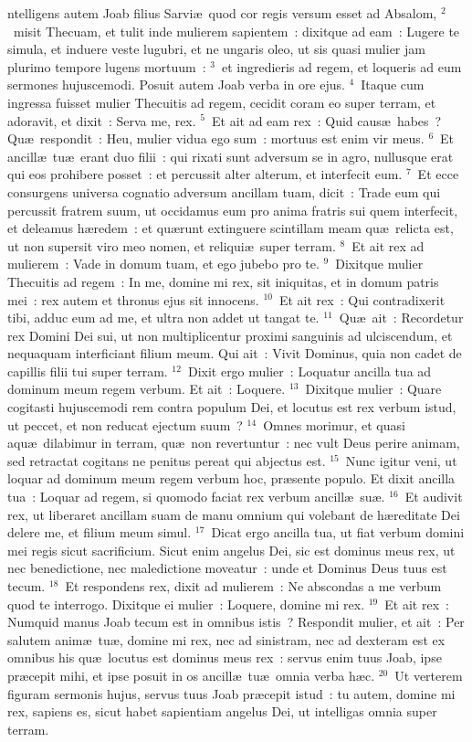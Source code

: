 \bchapter
{}ntelligens autem Joab filius Sarvi\ae\ quod cor regis versum esset ad Absalom,
${}^{2}$~misit Thecuam, et tulit inde mulierem sapientem~: dixitque ad eam~: Lugere te simula, et induere veste lugubri, et ne ungaris oleo, ut sis quasi mulier jam plurimo tempore lugens mortuum~:
${}^{3}$~et ingredieris ad regem, et loqueris ad eum sermones hujuscemodi. Posuit autem Joab verba in ore ejus.
${}^{4}$~Itaque cum ingressa fuisset mulier Thecuitis ad regem, cecidit coram eo super terram, et adoravit, et dixit~: Serva me, rex.
${}^{5}$~Et ait ad eam rex~: Quid caus\ae\ habes~? Qu\ae\ respondit~: Heu, mulier vidua ego sum~: mortuus est enim vir meus.
${}^{6}$~Et ancill\ae\ tu\ae\ erant duo filii~: qui rixati sunt adversum se in agro, nullusque erat qui eos prohibere posset~: et percussit alter alterum, et interfecit eum.
${}^{7}$~Et ecce consurgens universa cognatio adversum ancillam tuam, dicit~: Trade eum qui percussit fratrem suum, ut occidamus eum pro anima fratris sui quem interfecit, et deleamus h\ae redem~: et qu\ae runt extinguere scintillam meam qu\ae\ relicta est, ut non supersit viro meo nomen, et reliqui\ae\ super terram.
${}^{8}$~Et ait rex ad mulierem~: Vade in domum tuam, et ego jubebo pro te.
${}^{9}$~Dixitque mulier Thecuitis ad regem~: In me, domine mi rex, sit iniquitas, et in domum patris mei~: rex autem et thronus ejus sit innocens.
${}^{10}$~Et ait rex~: Qui contradixerit tibi, adduc eum ad me, et ultra non addet ut tangat te.
${}^{11}$~Qu\ae\ ait~: Recordetur rex Domini Dei sui, ut non multiplicentur proximi sanguinis ad ulciscendum, et nequaquam interficiant filium meum. Qui ait~: Vivit Dominus, quia non cadet de capillis filii tui super terram.
${}^{12}$~Dixit ergo mulier~: Loquatur ancilla tua ad dominum meum regem verbum. Et ait~: Loquere.
${}^{13}$~Dixitque mulier~: Quare cogitasti hujuscemodi rem contra populum Dei, et locutus est rex verbum istud, ut peccet, et non reducat ejectum suum~?
${}^{14}$~Omnes morimur, et quasi aqu\ae\ dilabimur in terram, qu\ae\ non revertuntur~: nec vult Deus perire animam, sed retractat cogitans ne penitus pereat qui abjectus est.
${}^{15}$~Nunc igitur veni, ut loquar ad dominum meum regem verbum hoc, pr\ae sente populo. Et dixit ancilla tua~: Loquar ad regem, si quomodo faciat rex verbum ancill\ae\ su\ae .
${}^{16}$~Et audivit rex, ut liberaret ancillam suam de manu omnium qui volebant de h\ae reditate Dei delere me, et filium meum simul.
${}^{17}$~Dicat ergo ancilla tua, ut fiat verbum domini mei regis sicut sacrificium. Sicut enim angelus Dei, sic est dominus meus rex, ut nec benedictione, nec maledictione moveatur~: unde et Dominus Deus tuus est tecum.
${}^{18}$~Et respondens rex, dixit ad mulierem~: Ne abscondas a me verbum quod te interrogo. Dixitque ei mulier~: Loquere, domine mi rex.
${}^{19}$~Et ait rex~: Numquid manus Joab tecum est in omnibus istis~? Respondit mulier, et ait~: Per salutem anim\ae\ tu\ae , domine mi rex, nec ad sinistram, nec ad dexteram est ex omnibus his qu\ae\ locutus est dominus meus rex~: servus enim tuus Joab, ipse pr\ae cepit mihi, et ipse posuit in os ancill\ae\ tu\ae\ omnia verba h\ae c.
${}^{20}$~Ut verterem figuram sermonis hujus, servus tuus Joab pr\ae cepit istud~: tu autem, domine mi rex, sapiens es, sicut habet sapientiam angelus Dei, ut intelligas omnia super terram.


